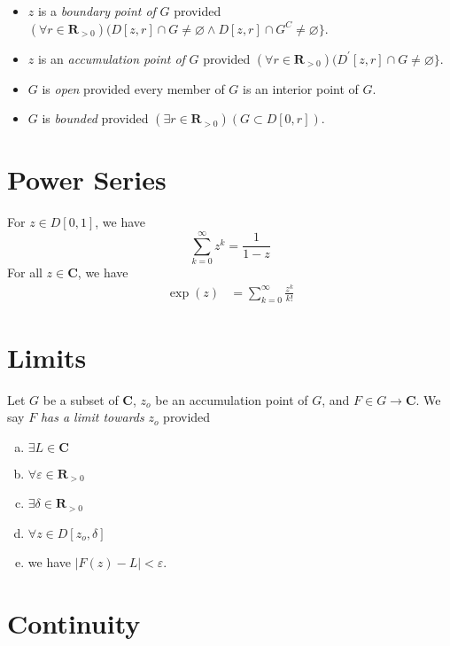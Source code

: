 \documentclass[letterpaper,landscape,9pt,fleqn]{extarticle}
\newcommand{\reals}{\mathbf{R}}
\newcommand{\complex}{\mathbf{C}}
\newenvironment{alphalist}{
  \begin{enumerate}[(a)]
    \addtolength{\itemsep}{-1.0\itemsep}}
  {\end{enumerate}}
\begin{document}
\begin{multicols*}{3}
\begin{itemize}
  \item $z$ is a \emph{boundary point of} $G$ provided
  \((\forall r \in \reals_{>0})(D[z,r] \cap G \neq \varnothing \land
  D[z,r] \cap G^C \neq \varnothing \}\).

  \item $z$ is an \emph{accumulation point of} $G$ provided
  \((\forall r \in \reals_{>0})(D^\prime [z,r] \cap G \neq \varnothing \}\).

  \item $G$ is \emph{open} provided every member of $G$ is an
  interior point of $G$.

  \item $G$ is \emph{bounded} provided 
    $(\exists r \in \reals_{> 0})(G \subset D[0,r])$.


  
\end{itemize}

\section*{Power Series}
For $z \in D[0,1]$, we have
\begin{equation*}
  \sum_{k=0}^\infty z^k = \frac{1}{1-z}
\end{equation*}
For all $z \in \complex$, we have
\begin{align*}
   \exp(z) &= \sum_{k=0}^\infty \frac{z^k}{k!}
\end{align*}

\section*{Limits}

Let $G$ be a subset of $\complex$, $z_o$ be an accumulation point of $G$, and $F \in G \to \complex$.
We say $F$ \emph{has a limit towards} $z_o$ provided
\begin{alphalist}
\item $\exists L \in \complex$
\item $\forall \varepsilon \in \reals_{>0}$
\item $\exists \delta  \in \reals_{>0}$
\item $\forall z \in D[z_o, \delta] $
\item we have $|F(z) - L| < \varepsilon$.
\end{alphalist}

\section*{Continuity}


\end{multicols*}
\end{document}
